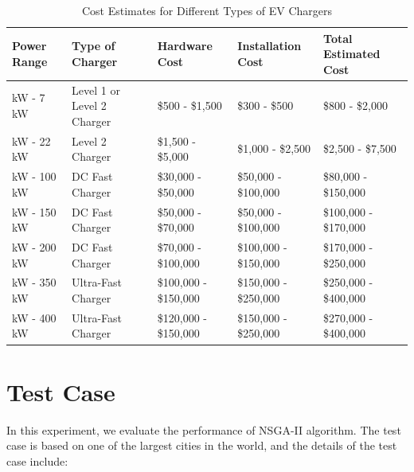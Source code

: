 \documentclass[12pt]{report}
\begin{document}
\begin{table}[h!]
    \centering
    \small %
    \begin{tabular}{|>{\raggedright\arraybackslash}p{2cm}|>{\raggedright\arraybackslash}p{3cm}|>{\raggedright\arraybackslash}p{2cm}|>{\raggedright\arraybackslash}p{2cm}|>{\raggedright\arraybackslash}p{3cm}|}
    \hline
    \textbf{Power Range} & \textbf{Type of Charger} & \textbf{Hardware Cost} & \textbf{Installation Cost} & \textbf{Total Estimated Cost} \\
    \hline
    3 kW - 7 kW & Level 1 or Level 2 Charger & \$500 - \$1,500 & \$300 - \$500 & \$800 - \$2,000 \\
    \hline
    7 kW - 22 kW & Level 2 Charger & \$1,500 - \$5,000 & \$1,000 - \$2,500 & \$2,500 - \$7,500 \\
    \hline
    50 kW - 100 kW & DC Fast Charger & \$30,000 - \$50,000 & \$50,000 - \$100,000 & \$80,000 - \$150,000 \\
    \hline
    100 kW - 150 kW & DC Fast Charger & \$50,000 - \$70,000 & \$50,000 - \$100,000 & \$100,000 - \$170,000 \\
    \hline
    150 kW - 200 kW & DC Fast Charger & \$70,000 - \$100,000 & \$100,000 - \$150,000 & \$170,000 - \$250,000 \\
    \hline
    200 kW - 350 kW & Ultra-Fast Charger & \$100,000 - \$150,000 & \$150,000 - \$250,000 & \$250,000 - \$400,000 \\
    \hline
    350 kW - 400 kW & Ultra-Fast Charger & \$120,000 - \$150,000 & \$150,000 - \$250,000 & \$270,000 - \$400,000 \\
    \hline
    \end{tabular}
    \caption{Cost Estimates for Different Types of EV Chargers}
    \end{table}
    


\section{Test Case}
In this experiment, we evaluate the performance of NSGA-II algorithm. The test case is based on one of the largest cities in the world, and the details of the test case include:
\end{document}
